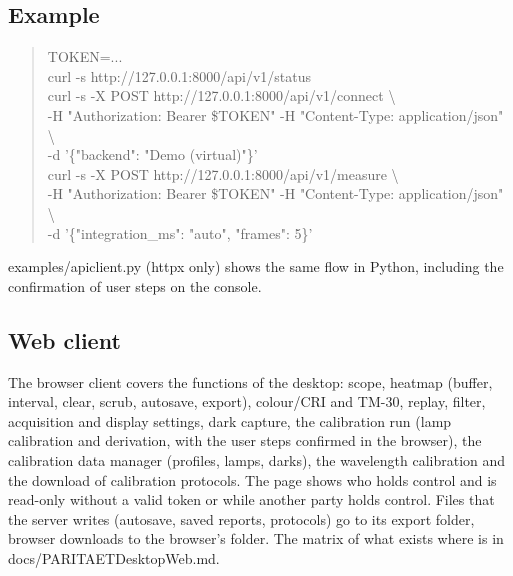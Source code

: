 \documentclass[12pt,a4paper]{article}
\DeclareRobustCommand{\code}[1]{{\ttfamily\small\def\_{\rawus\allowbreak}#1}}
\DeclareRobustCommand{\file}[1]{{\ttfamily\small\def\_{\rawus\allowbreak}#1}}
\begin{document}
\subsection{Example}
\begin{quote}\ttfamily\small\raggedright
TOKEN=...\\
curl -s http://127.0.0.1:8000/api/v1/status\\
curl -s -X POST http://127.0.0.1:8000/api/v1/connect \textbackslash\\
\hspace*{1em}-H "Authorization: Bearer \$TOKEN" -H "Content-Type: application/json" \textbackslash\\
\hspace*{1em}-d '\{"backend": "Demo (virtual)"\}'\\
curl -s -X POST http://127.0.0.1:8000/api/v1/measure \textbackslash\\
\hspace*{1em}-H "Authorization: Bearer \$TOKEN" -H "Content-Type: application/json" \textbackslash\\
\hspace*{1em}-d '\{"integration\_ms": "auto", "frames": 5\}'
\end{quote}
\file{examples/api\_client.py} (\code{httpx} only) shows the same flow in Python,
including the confirmation of user steps on the console.

\subsection{Web client}
The browser client covers the functions of the desktop: scope, heatmap (buffer,
interval, clear, scrub, autosave, export), colour\slash CRI and TM-30, replay,
filter, acquisition and display settings, dark capture, the calibration run
(lamp calibration and derivation, with the user steps confirmed in the browser),
the calibration data manager (profiles, lamps, darks), the wavelength calibration
and the download of calibration protocols. The page shows who holds control and is
read-only without a valid token or while another party holds control. Files that the
server writes (autosave, saved reports, protocols) go to its export folder, browser
downloads to the browser's folder. The matrix of what exists where is in
\file{docs/PARITAET\_Desktop\_Web.md}.
\end{document}
